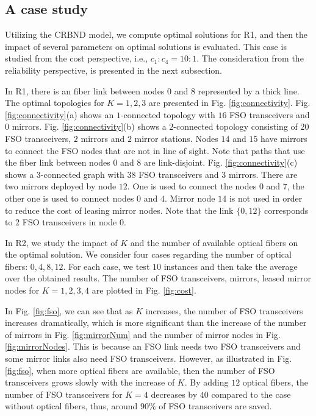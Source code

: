 \documentclass[onecolumn,11pt,draftclsnofoot]{IEEEtran}
\begin{document}
\subsection{A case study}
Utilizing the CRBND model, we compute optimal solutions for R1, and then the impact of several parameters on optimal solutions is evaluated.
This case is studied from the cost perspective, i.e., $c_1 : c_4 = 10 :1$. The consideration from the reliability perspective, is presented in the next subsection.

In R1, there is an fiber link between nodes $0$ and $8$ represented by a thick line. The optimal topologies for $K=1,2,3$ are presented in Fig. \eqref{fig:connectivity}. Fig. \eqref{fig:connectivity}(a) shows an $1$-connected topology with $16$ FSO transceivers and $0$ mirrors. Fig. \eqref{fig:connectivity}(b) shows a $2$-connected topology consisting of $20$ FSO transceivers, $2$ mirrors and $2$ mirror stations.
Nodes $14$ and $15$ have mirrors to connect the FSO nodes that are not in line of sight. Note that paths that use the fiber link between nodes $0$ and $8$ are link-disjoint. Fig. \eqref{fig:connectivity}(c) shows a $3$-connected graph with $38$ FSO transceivers and $3$ mirrors. There are two mirrors deployed by node $12$. One is used to connect the nodes $0$ and $7$, the other one is used to connect nodes $0$ and $4$. Mirror node $14$ is not used in order to reduce the cost of leasing mirror nodes. Note that the link $\{0,12\}$ corresponds to $2$ FSO transceivers in node $0$.

In R2, we study the impact of $K$ and the number of available optical fibers on the optimal solution. We consider four cases regarding the number of optical fibers: $0,4,8,12$. For each case, we test $10$ instances and then take the average over the obtained results. The number of FSO transceivers, mirrors, leased mirror nodes for $K=1,2,3,4$ are plotted in Fig. \ref{fig:cost}.

In Fig. \ref{fig:fso}, we can see that as $K$ increases, the number of FSO transceivers increases dramatically, which is more significant than the increase of the number of mirrors in Fig. \ref{fig:mirrorNum} and the number of mirror nodes in Fig. \ref{fig:mirrorNodes}. This is because an FSO link needs two FSO transceivers and some mirror links also need FSO transceivers. However, as illustrated in Fig. \ref{fig:fso}, when more optical fibers are available, then the number of FSO transceivers grows slowly with the increase of $K$. By adding $12$ optical fibers, the number of FSO transceivers for $K=4$ decreases by $40$ compared to the case without optical fibers, thus, around $90\%$ of FSO transceivers are saved.
\end{document}

